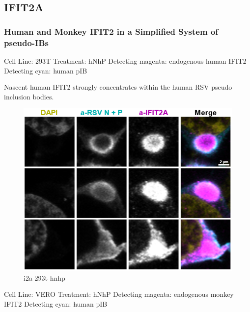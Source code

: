 \subsection{IFIT2A}
\subsubsection{Human and Monkey IFIT2 in a Simplified System of pseudo-IBs} \label{Human and Monkey IFIT2 in a Simplified System of pseudo-IBs}
Cell Line: 293T \newline
Treatment: hNhP \newline
Detecting magenta: endogenous human IFIT2 \newline
Detecting cyan: human pIB \newline

Nascent human IFIT2 strongly concentrates within the human RSV pseudo inclusion bodies.

\begin{figure}
    \centering
    \includegraphics[width=1\linewidth]{09. Chapter 4//Figs//01. I2A/01. i2a 293t hnhp.png}
    \caption[i2a 293t hnhp]{i2a 293t hnhp}
    \label{i2a 293t hnhp}
\end{figure}

Cell Line: VERO \newline
Treatment: hNhP \newline
Detecting magenta: endogenous monkey IFIT2 \newline
Detecting cyan: human pIB \newline

